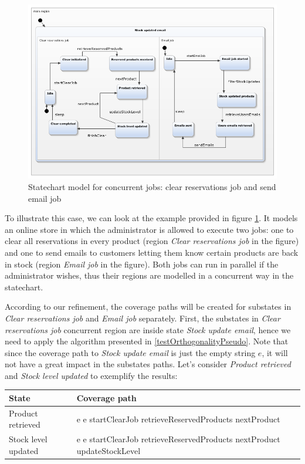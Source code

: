 \begin{figure}[htb]
\centering
\includegraphics[width=15cm]{figuras/stockUpdateEmail}
\caption{\label{fig:stockUpdateEmail} Statechart model for concurrent jobs: clear reservations job and send email job}
\end{figure}

To illustrate this case, we can look at the example provided in figure \ref{fig:stockUpdateEmail}. It models an online store in which the administrator is allowed to execute two jobs: one to clear all reservations in every product (region \textit{Clear reservations job} in the figure) and one to send emails to customers letting them know certain products are back in stock (region \textit{Email job} in the figure). Both jobs can run in parallel if the administrator wishes, thus their regions are modelled in a concurrent way in the statechart. 

According to our refinement, the coverage paths will be created for substates in \textit{Clear reservations job} and \textit{Email job} separately. First, the substates in \textit{Clear reservations job} concurrent region are inside state \textit{Stock update email}, hence we need to apply the algorithm presented in \ref{testOrthogonalityPseudo}. Note that since the coverage path to \textit{Stock update email} is just the empty string $e$, it will not have a great impact in the substates paths. Let's consider \textit{Product retrieved} and \textit{Stock level updated} to exemplify the results:

\begin{center}
\begin{tabular}{| p{4cm} | p{10cm}|}

\hline

State & Coverage path \\ \hline

Product retrieved & e e startClearJob retrieveReservedProducts nextProduct \\ \hline

Stock level updated & e e startClearJob retrieveReservedProducts nextProduct updateStockLevel \\

\hline
\end{tabular}
\end{center}

